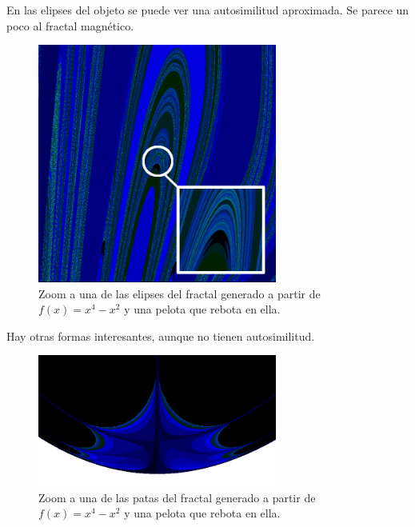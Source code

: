 \noindent En las elipses del objeto se puede ver una autosimilitud aproximada. Se parece un poco al fractal magnético.
\begin{figure}[H]
    \centering
    \includegraphics[width=0.7\textwidth]{figures/bouncing-ball-fractal-zoom-1.png}
    \caption{Zoom a una de las elipses del fractal generado a partir de $f(x) = x^4 - x^2$ y una pelota que rebota en ella.}
    \label{fig:ball-fractal-zoom}
\end{figure}

\noindent Hay otras formas interesantes, aunque no tienen autosimilitud.

\begin{figure}[H]
    \centering
    \includegraphics[width=0.7\textwidth]{figures/bouncing-ball-fractal-zoom-2.png}
    \caption{Zoom a una de las patas del fractal generado a partir de $f(x) = x^4 - x^2$ y una pelota que rebota en ella.}
    \label{fig:ball-fractal-zoom-2}
\end{figure}
